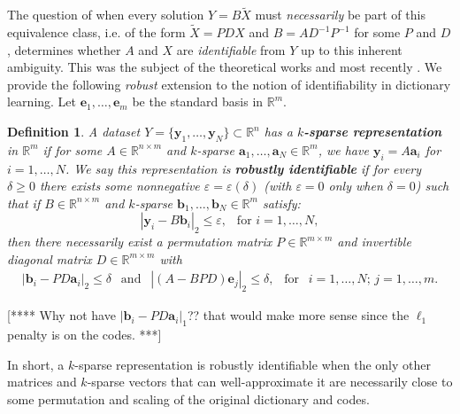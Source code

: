 \documentclass[journal, onecolumn]{IEEEtran}
\newtheorem{definition}{Definition}
\begin{document}
The question of when every solution $Y = B \tilde X$ must \emph{necessarily} be part of this equivalence class, i.e. of the form $\tilde X = PDX$ and $B = AD^{-1}P^{-1}$ for some $P$ and $D$, determines whether $A$ and $X$ are \emph{identifiable} from $Y$ up to this inherent ambiguity. This was the subject of the theoretical works \cite{Georgiev05, Aharon06} and most recently \cite{HS15}. We provide the following \emph{robust} extension to the notion of identifiability in dictionary learning. Let $\mathbf{e}_1, \ldots, \mathbf{e}_m$ be the standard basis in $\mathbb{R}^m$. 

\begin{definition}\label{Uniqueness}
A dataset $Y = \{\mathbf{y}_1, \ldots, \mathbf{y}_N\} \subset \mathbb{R}^n$ has a \textbf{$k$-sparse representation} in $\mathbb{R}^m$ if for some $A \in \mathbb{R}^{n \times m}$ and $k$-sparse $\mathbf{a}_1, \ldots, \mathbf{a}_N \in \mathbb{R}^m$, we have $\mathbf{y}_i = A\mathbf{a}_i$ for $i = 1, \ldots, N$. We say this representation is \textbf{robustly identifiable} if for every $\delta \geq 0$ there exists some nonnegative $\varepsilon = \varepsilon(\delta)$ (with $\varepsilon = 0$ only when $\delta =0$) such that if $B \in \mathbb{R}^{n \times m}$ and $k$-sparse $\mathbf{b}_1, \ldots, \mathbf{b}_N \in \mathbb{R}^m$ satisfy:
\[|\mathbf{y}_i - B\mathbf{b}_i|_2 \leq \varepsilon, \ \ \text{ for } i = 1, \ldots, N,\]
%
then there necessarily exist a permutation matrix $P \in \mathbb{R}^{m \times m}$ and invertible diagonal matrix $D \in \mathbb{R}^{m \times m}$ with
\begin{align}\label{def1}
|\mathbf{b}_i - PD\mathbf{a}_i|_2 \leq \delta \ \ \text{ and } \ \ |(A - BPD)\mathbf{e}_j|_2 \leq \delta, \ \ \text{ for } \ \ i = 1, \ldots, N; \, j = 1, \ldots, m.
\end{align}
\end{definition}
[**** Why not have $|\mathbf{b}_i - PD\mathbf{a}_i|_1$??  that would make more sense since the $\ell_1$ penalty is on the codes.  ***]

In short, a $k$-sparse representation is robustly identifiable when the only other matrices and $k$-sparse vectors that can well-approximate it are necessarily close to some permutation and scaling of the original dictionary and codes.
\end{document}
